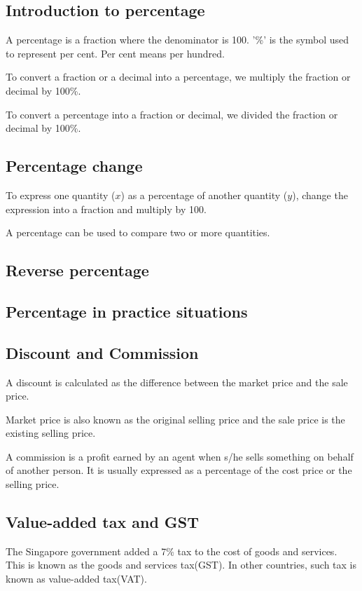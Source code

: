 \documentclass[../main]{subfiles}
\begin{document}
\subsection{Introduction to percentage}
A percentage is a fraction where the denominator is 100. '\%' is the symbol used
to represent per cent. Per cent means per hundred.

To convert a fraction or a decimal into a percentage, we multiply the fraction
or decimal by 100\%.

To convert a percentage into a fraction or decimal, we divided the fraction or
decimal by 100\%.

\subsection{Percentage change}

To express one quantity ($x$) as a percentage of another quantity ($y$), change
the expression into a fraction and multiply by 100.

A percentage can be used to compare two or more quantities.

\subsection{Reverse percentage}
\subsection{Percentage in practice situations}

\subsection{Discount and Commission}
A discount is calculated as the difference between the market price and the sale
price.

Market price is also known as the original selling price and the sale price is
the existing selling price.

A commission is a profit earned by an agent when s/he sells something on behalf
of another person. It is usually expressed as a percentage of the cost price or
the selling price.

\subsection{Value-added tax and GST}
The Singapore government added a 7\% tax to the cost of goods and services. This
is known as the goods and services tax(GST). In other countries, such tax is
known as value-added tax(VAT).
\end{document}
